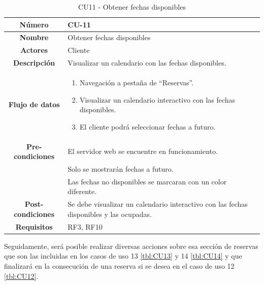 \begin{table}[h!tb]
	\centering
	\begin{adjustbox}{width=1\textwidth}
	\begin{tabular}{|c|p{\textwidth}|}
		\hline {\bf Número} & CU-11 \\
		\hline {\bf Nombre} & Obtener fechas disponibles\\
		\hline {\bf Actores} & Cliente \\
		\hline {\bf Descripción} & Visualizar un calendario con las fechas disponibles. \\
		\hline {\bf Flujo de datos}
		& 
		\begin{enumerate}
			\item Navegación a pestaña de ``Reservas''.
            \item Visualizar un calendario interactivo con las fechas disponibles.
            \item El cliente podrá seleccionar fechas a futuro.
           
        \end{enumerate}\\
		\hline {\bf Pre-condiciones}
		& El servidor web se encuentre en funcionamiento. \\
        & Solo se mostrarán fechas a futuro. \\
        & Las fechas no disponibles se marcaran con un color diferente. \\
		\hline {\bf Post-condiciones}
		& Se debe visualizar un calendario interactivo con las fechas disponibles y las ocupadas. \\
    
		\hline {\bf Requisitos} & RF3, RF10 \\
		\hline 
	\end{tabular}
	\end{adjustbox}
	\caption{CU11 - Obtener fechas disponibles\label{tbl:CU11}}
\end{table}
Seguidamente, será posible realizar diversas acciones sobre esa sección de reservas que son las incluidas en los casos de uso 13 \ref{tbl:CU13} y 14 \ref{tbl:CU14} y que finalizará en la consecución de una reserva si se desea en el caso de uso 12 \ref{tbl:CU12}.
